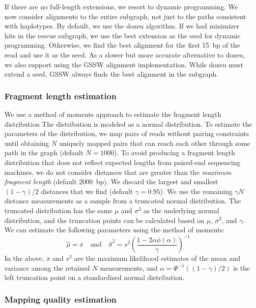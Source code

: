 \documentclass[11pt]{ucscthesis}
\newcommand{\param}[1]{\emph{#1}}
\begin{document}
If there are no full-length extensions, we resort to dynamic programming.
We now consider alignments to the entire subgraph, not just to the paths consistent with haplotypes.
By default, we use the dozeu algorithm.
If we had minimizer hits in the rescue subgraph, we use the best extension as the seed for dynamic programming.
Otherwise, we find the best alignment for the first 15~bp of the read and use it as the seed.
As a slower but more accurate alternative to dozeu, we also support using the GSSW alignment implementation\cite{zhao_gssw_2013}.
While dozeu must extend a seed, GSSW always finds the best alignment in the subgraph.


\subsubsection{Fragment length estimation}
\label{subsec:fragment-length}

We use a method of moments approach to estimate the fragment length distribution
The distribution is modeled as a normal distribution.
To estimate the parameters of the distribution, we map pairs of reads without pairing constraints until obtaining $N$ uniquely mapped pairs that can reach each other through some path in the graph (default $N = 1000$).
To avoid producing a fragment length distribution that does not reflect expected lengths from paired-end sequencing machines, we do not consider distances that are greater than the \param{maximum fragment length} (default $2000$~bp).
We discard the largest and smallest $(1 - \gamma) / 2$ distances that we find (default $\gamma = 0.95$).
We use the remaining $\gamma N$ distance measurements as a sample from a truncated normal distribution.
The truncated distribution has the same $\mu$ and $\sigma^{2}$ as the underlying normal distribution, and the truncation points can be calculated based on $\mu$, $\sigma^{2}$, and $\gamma$.
We can estimate the following parameters using the method of moments:
$$
\hat{\mu} = \bar{x} \quad \textrm{and} \quad
\hat{\sigma}^{2} = s^{2} \left( \frac{1 - 2 \alpha \phi(\alpha)}{\gamma} \right)^{-1}
$$
In the above, $\bar{x}$ and $s^{2}$ are the maximum likelihood estimates of the mean and variance among the retained $N$ measurements, and $\alpha = \Phi^{-1}((1 - \gamma) / 2)$ is the left truncation point on a standardized normal distribution.


\subsubsection{Mapping quality estimation}
\end{document}
